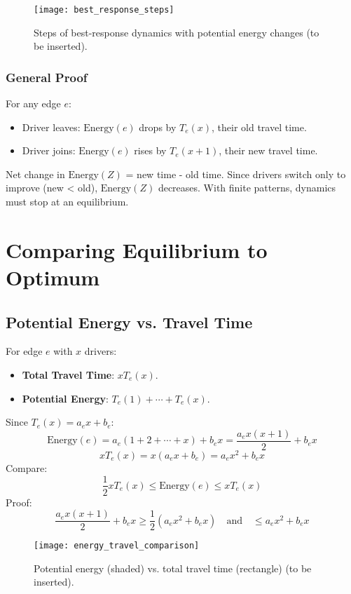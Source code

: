 \documentclass[a4paper,12pt]{article}
\begin{document}
\begin{figure}[h]
    \centering
    \texttt{[image: best\_response\_steps]} %
    \caption{Steps of best-response dynamics with potential energy changes (to be inserted).}
    \label{fig:dynamics}
\end{figure}

\subsubsection{General Proof}
For any edge \( e \):
\begin{itemize}
    \item Driver leaves: \( \text{Energy}(e) \) drops by \( T_e(x) \), their old travel time.
    \item Driver joins: \( \text{Energy}(e) \) rises by \( T_e(x+1) \), their new travel time.
\end{itemize}
Net change in \( \text{Energy}(Z) \) = new time - old time. Since drivers switch only to improve (new < old), \( \text{Energy}(Z) \) decreases. With finite patterns, dynamics must stop at an equilibrium.

\section{Comparing Equilibrium to Optimum}
\subsection{Potential Energy vs. Travel Time}
For edge \( e \) with \( x \) drivers:
\begin{itemize}
    \item \textbf{Total Travel Time}: \( x T_e(x) \).
    \item \textbf{Potential Energy}: \( T_e(1) + \cdots + T_e(x) \).
\end{itemize}
Since \( T_e(x) = a_e x + b_e \):
\[
\text{Energy}(e) = a_e (1 + 2 + \cdots + x) + b_e x = \frac{a_e x (x+1)}{2} + b_e x
\]
\[
x T_e(x) = x (a_e x + b_e) = a_e x^2 + b_e x
\]
Compare:
\[
\frac{1}{2} x T_e(x) \leq \text{Energy}(e) \leq x T_e(x)
\]
Proof:
\[
\frac{a_e x (x+1)}{2} + b_e x \geq \frac{1}{2} (a_e x^2 + b_e x) \quad \text{and} \quad \leq a_e x^2 + b_e x
\]

\begin{figure}[h]
    \centering
    \texttt{[image: energy\_travel\_comparison]} %
    \caption{Potential energy (shaded) vs. total travel time (rectangle) (to be inserted).}
    \label{fig:energy}
\end{figure}
\end{document}
